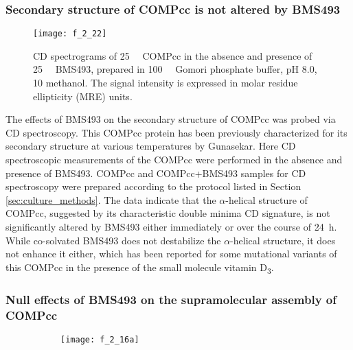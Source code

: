 \begin{refsection}
\subsubsection{Secondary structure of COMPcc is not altered by BMS493}
\label{sec:comp_cd}
\begin{figure}[h!] \centering \texttt{[image: f\_2\_22]}
    \caption{CD spectrograms of \SI{25}{\micro\moLar} COMPcc in the absence and
    presence of \SI{25}{\micro\moLar} BMS493, prepared in \SI{100}{\milli\moLar}
    Gomori phosphate buffer, pH 8.0, \SI{10}{\volper} methanol. The signal
    intensity is expressed in molar residue ellipticity (MRE)
units.}\label{fig:comp_cd} \end{figure}
The effects of BMS493 on the secondary structure of COMPcc was probed via CD
spectroscopy. This COMPcc protein has been previously characterized for its
secondary structure at various temperatures by Gunasekar.\cite{Gunasekar2009}
Here CD spectroscopic measurements of the COMPcc were performed in the absence and
presence of BMS493. COMPcc and COMPcc+BMS493 samples for CD spectroscopy were
prepared according to the protocol listed in Section \ref{sec:culture_methods}.
The data indicate that the ${\alpha}$-helical structure of COMPcc, suggested by its
characteristic double minima CD signature, is not significantly altered by
BMS493 either immediately or over the course of \SI{24}{\hour}. While
co-solvated BMS493 does not destabilize the ${\alpha}$-helical structure, it does not
enhance it either, which has been reported for some mutational variants of this
COMPcc in the presence of the small molecule vitamin
D\textsubscript{3}.\cite{Gunasekar2009}

\subsubsection{Null effects of BMS493 on the supramolecular assembly of COMPcc}
\begin{figure}[h!]
    \centering
    \begin{subfigure}[b]{0.5\textwidth}
        \texttt{[image: f\_2\_16a]}
        \caption{}
        \label{fig:zonal_elution_chrom}
    \end{subfigure}


\end{figure}
\end{refsection}
